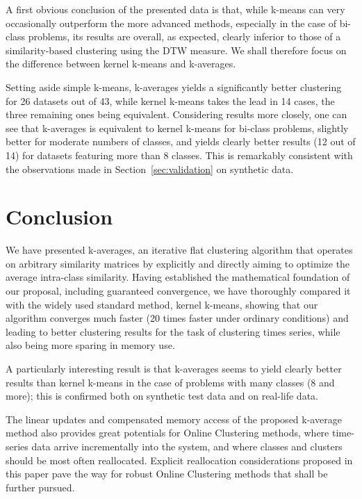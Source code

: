 \documentclass[10pt,journal,compsoc]{IEEEtran}
\begin{document}
A first obvious conclusion of the presented data is that, while k-means can very occasionally outperform the more advanced methods, especially in the case of bi-class problems, its results are overall, as expected, clearly inferior to those of a similarity-based clustering using the DTW measure. We shall therefore focus on the difference between kernel k-means and k-averages.

Setting aside simple k-means, k-averages yields a significantly better clustering for 26 datasets out of 43, while kernel k-means takes the lead in 14 cases, the three remaining ones being equivalent. Considering results more closely, one can see that k-averages is equivalent to kernel k-means for bi-class problems, slightly better for moderate numbers of classes, and yields clearly better results (12 out of 14) for datasets featuring more than 8 classes. This is remarkably consistent with the observations made in Section~\ref{sec:validation} on synthetic data.

\section{Conclusion}

We have presented k-averages, an iterative flat clustering algorithm that operates on arbitrary similarity matrices by explicitly and directly aiming to optimize the average intra-class similarity. Having established the mathematical foundation of our proposal, including guaranteed convergence, we have thoroughly compared it with the widely used standard method, kernel k-means, showing that our algorithm converges much faster (20 times faster under ordinary conditions) and leading to better clustering results for the task of clustering times series, while also being more sparing in memory use.

A particularly interesting result is that k-averages seems to yield clearly better results than kernel k-means in the case of problems with many classes (8 and more); this is confirmed both on synthetic test data and on real-life data.


The linear updates and compensated memory access of the proposed k-average method also provides great potentials for Online Clustering methods, where time-series data arrive incrementally into the system, and where classes and clusters should be most often reallocated. Explicit reallocation considerations proposed in this paper pave the way for robust Online Clustering methods that shall be further pursued.
\end{document}
